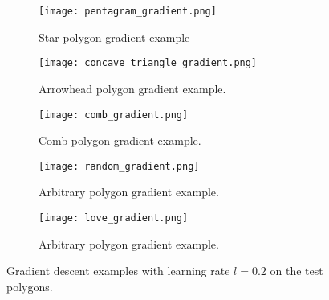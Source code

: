 \begin{figure}[h!]
    \centering
    \begin{subfigure}{0.45\textwidth}
        \centering
        \texttt{[image: pentagram\_gradient.png]}
        \caption{Star polygon gradient example}
        \label{fig:star_gradient}
    \end{subfigure}
    \begin{subfigure}{0.45\textwidth}
        \centering
        \texttt{[image: concave\_triangle\_gradient.png]}
        \caption{Arrowhead polygon gradient example.}
        \label{fig:concave_gradient}
    \end{subfigure}
    \begin{subfigure}{0.45\textwidth}
        \centering
        \texttt{[image: comb\_gradient.png]}
        \caption{Comb polygon gradient example.}
        \label{fig:comb_gradient}
    \end{subfigure}
    \begin{subfigure}{0.45\textwidth}
        \centering
        \texttt{[image: random\_gradient.png]}
        \caption{Arbitrary polygon gradient example.}
        \label{fig:random_gradient}
    \end{subfigure}
    \begin{subfigure}{\textwidth}
        \centering
        \texttt{[image: love\_gradient.png]}
        \caption{Arbitrary polygon gradient example.}
        \label{fig:love_gradient}
    \end{subfigure}
    \caption{Gradient descent examples with learning rate $l = 0.2$ on the test polygons.}
    \label{fig:gradients}
\end{figure}